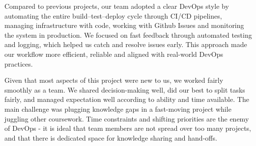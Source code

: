 Compared to previous projects, our team adopted a clear DevOps style by automating the entire build–test–deploy cycle through CI/CD pipelines, managing infrastructure with code, working with Github Issues and monitoring the system in production. We focused on fast feedback through automated testing and logging, which helped us catch and resolve issues early. This approach made our workflow more efficient, reliable and aligned with real-world DevOps practices. 

Given that most aspects of this project were new to us, we worked fairly smoothly as a team. We shared decision-making well, did our best to split tasks fairly, and managed expectation well according to ability and time available. The main challenge was plugging knowledge gaps in a fast-moving project while juggling other coursework. Time constraints and shifting priorities are the enemy of DevOps - it is ideal that team members are not spread over too many projects, and that there is dedicated space for knowledge sharing and hand-offs. 

